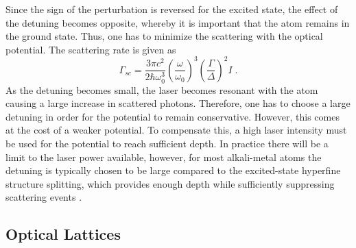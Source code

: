 Since the sign of the perturbation is reversed for the excited state, the effect of the detuning becomes opposite, whereby it is important that the atom remains in the ground state. Thus, one has to minimize the scattering with the optical potential. The scattering rate is given as \cite{grimm}
\begin{equation}
	\Gamma_{sc} = \frac{3 \pi c^2}{2 \hbar \omega_{0}^3} \left( \frac{\omega}{\omega_0} \right) ^3 \left( \frac{\Gamma}{\Delta} \right) ^2 I \; .
\end{equation}
As the detuning becomes small, the laser becomes resonant with the atom causing a large increase in scattered photons. Therefore, one has to choose a large detuning in order for the potential to remain conservative. However, this comes at the cost of a weaker potential. To compensate this, a high laser intensity must be used for the potential to reach sufficient depth. In practice there will be a limit to the laser power available, however, for most alkali-metal atoms the detuning is typically chosen to be large compared to the excited-state hyperfine structure splitting, which provides enough depth while sufficiently suppressing scattering events \cite{manybodyBloch}. 


\subsection{Optical Lattices}


